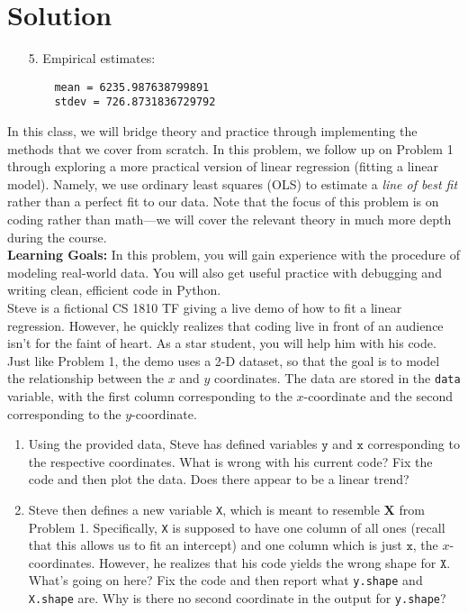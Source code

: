 \documentclass{harvardml}
\theoremstyle{definition}
\theoremstyle{plain}
\newenvironment{solution}
  {\color{blue}\section*{Solution}}
{}
\begin{document}
\begin{solution}
\begin{enumerate}
    \item[5.] Empirical estimates:
    \begin{verbatim}
    mean = 6235.987638799891
    stdev = 726.8731836729792
    \end{verbatim}
\end{enumerate}

\end{solution} 

\newpage 

\begin{problem} 
In this class, we will bridge theory and practice through implementing the methods that we cover from scratch. In this problem, we follow up on Problem 1 through exploring a more practical version of linear regression (fitting a linear model). Namely, we use ordinary least squares (OLS) to estimate a \textit{line of best fit} rather than a perfect fit to our data. Note that the focus of this problem is on coding rather than math---we will cover the relevant theory in much more depth during the course.\\

\noindent \textbf{Learning Goals:} In this problem, you will gain experience with the procedure of modeling real-world data. You will also get useful practice with debugging and writing clean, efficient code in Python. \\

\noindent Steve is a fictional CS 1810 TF giving a live demo of how to fit a linear regression. However, he quickly realizes that coding live in front of an audience isn't for the faint of heart. As a star student, you will help him with his code. Just like Problem 1, the demo uses a 2-D dataset, so that the goal is to model the relationship between the $x$ and $y$ coordinates. The data are stored in the \texttt{data} variable, with the first column corresponding to the $x$-coordinate and the second corresponding to the $y$-coordinate. 

\begin{enumerate}
    \item Using the provided data, Steve has defined variables $\texttt{y}$ and $\texttt{x}$ corresponding to the respective coordinates.  What is wrong with his current code? Fix the code and then plot the data. Does there appear to be a linear trend?

    \item Steve then defines a new variable \texttt{X}, which is meant to resemble $\bm X$ from Problem 1. Specifically, \texttt{X} is supposed to have one column of all ones (recall that this allows us to fit an intercept) and one column which is just $\texttt{x}$, the $x$-coordinates. However, he realizes that his code yields the wrong shape for $\texttt{X}$. What's going on here? Fix the code and then report what \texttt{y.shape} and \texttt{X.shape} are. Why is there no second coordinate in the output for \texttt{y.shape}?
    

\end{enumerate}
\end{problem}
\end{document}
